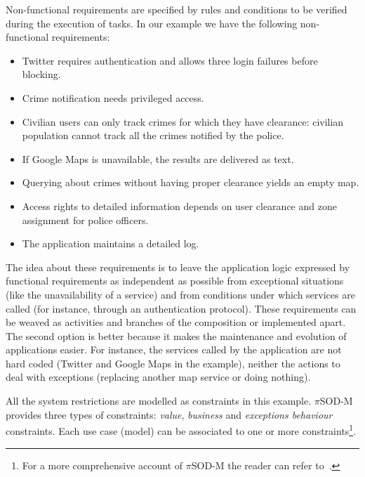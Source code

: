 Non-functional requirements are specified by rules and conditions to be verified during the execution of tasks.
In our example we have the following non-functional requirements:
\begin{itemize}
\item Twitter requires authentication and allows three login failures before blocking. 
\item Crime notification needs privileged access.
\item Civilian users can only track crimes for which they have clearance: civilian population cannot track all the crimes notified by the police. 
\item If \textsf{Google Maps} is unavailable, the results are delivered as text. 
\item Querying about crimes without having proper clearance yields an empty map.
\item Access rights to detailed information depends on user clearance and zone assignment for police officers. 
\item The application maintains a detailed log. 
\end{itemize}
The idea about these requirements is to leave the application logic expressed by functional requirements as independent as possible from exceptional situations (like the unavailability of a service) and from conditions under which services are called (for instance, through an authentication protocol). These requirements can be  weaved as activities and branches of the composition or implemented apart. The second option is better because it makes the maintenance and evolution of applications easier. For instance, the services called by the application are not hard coded (\textsf{Twitter} and \textsf{Google Maps} in the example), neither the actions to deal with exceptions (replacing another map service or doing nothing).

All the system restrictions are modelled as constraints in this example. 
$\pi$SOD-M provides three types of constraints:
\textit{value}, \textit{business} and \textit{exceptions behaviour} constraints.
Each use case (model) can be associated to one or more constraints\footnote{For a more comprehensive account of $\pi$SOD-M the reader can refer to~\cite{PlacidoThesis2012}.}.
